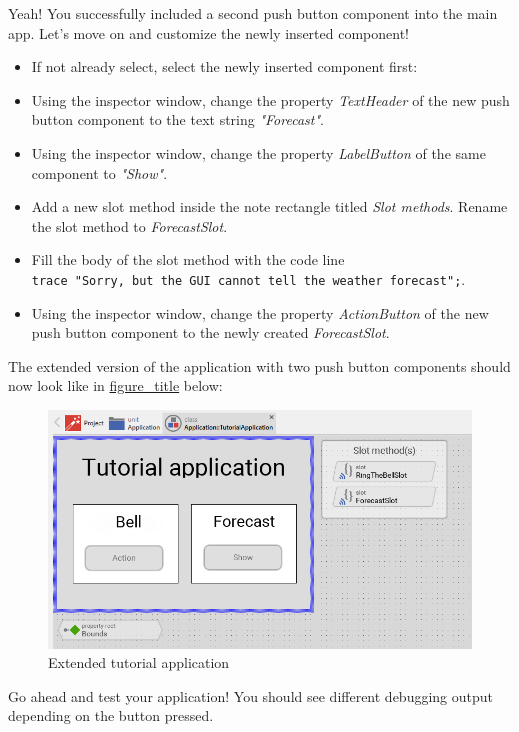 \documentclass[
  a4paper,
,tablecaptionabove
]{scrbook}
\begin{document}
Yeah! You successfully included a second push button component into the
main app. Let's move on and customize the newly inserted component!

\begin{itemize}
\item
  If not already select, select the newly inserted component first:
\item
  Using the inspector window, change the property \emph{TextHeader} of
  the new push button component to the text string \emph{"Forecast"}.
\item
  Using the inspector window, change the property \emph{LabelButton} of
  the same component to \emph{"Show"}.
\item
  Add a new slot method inside the note rectangle titled \emph{Slot
  methods}. Rename the slot method to \emph{ForecastSlot}.
\item
  Fill the body of the slot method with the code line
  \texttt{trace\ "Sorry,\ but\ the\ GUI\ cannot\ tell\ the\ weather\ forecast";}.
\item
  Using the inspector window, change the property \emph{ActionButton} of
  the new push button component to the newly created
  \emph{ForecastSlot}.
\end{itemize}

The extended version of the application with two push button components
should now look like in
\protect\hyperlink{fig:ExtendedApplication}{figure\_title} below:

\begin{figure}
\centering
\includegraphics{./../asciidoc/modules/ROOT/assets/images/reusablecomponent/TutorialApplicationExtended.png}
\caption{Extended tutorial application}
\end{figure}

Go ahead and test your application! You should see different debugging
output depending on the button pressed.
\end{document}
